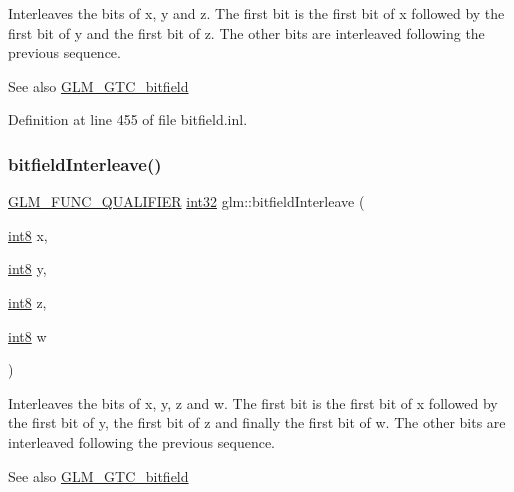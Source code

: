 Interleaves the bits of x, y and z. The first bit is the first bit of x followed by the first bit of y and the first bit of z. The other bits are interleaved following the previous sequence.

\begin{DoxySeeAlso}{See also}
\mbox{\hyperlink{group__gtc__bitfield}{G\+L\+M\+\_\+\+G\+T\+C\+\_\+bitfield}} 
\end{DoxySeeAlso}


Definition at line 455 of file bitfield.\+inl.

\mbox{\label{group__gtc__bitfield_ga7da84ecc2b3a46c9c08a9f40012359cf}} 
\subsubsection{\texorpdfstring{bitfieldInterleave()}{bitfieldInterleave()}\hspace{0.1cm}{\footnotesize\ttfamily [13/16]}}
{\footnotesize\ttfamily \mbox{\hyperlink{setup_8hpp_a33fdea6f91c5f834105f7415e2a64407}{G\+L\+M\+\_\+\+F\+U\+N\+C\+\_\+\+Q\+U\+A\+L\+I\+F\+I\+ER}} \mbox{\hyperlink{group__gtc__type__precision_ga632d8b25f6b61659f39ea4321fab92a4}{int32}} glm\+::bitfield\+Interleave (\begin{DoxyParamCaption}\item[{\mbox{\hyperlink{group__gtc__type__precision_ga96254f9c1c4506fc8eb5cf3301ce8565}{int8}}}]{x,  }\item[{\mbox{\hyperlink{group__gtc__type__precision_ga96254f9c1c4506fc8eb5cf3301ce8565}{int8}}}]{y,  }\item[{\mbox{\hyperlink{group__gtc__type__precision_ga96254f9c1c4506fc8eb5cf3301ce8565}{int8}}}]{z,  }\item[{\mbox{\hyperlink{group__gtc__type__precision_ga96254f9c1c4506fc8eb5cf3301ce8565}{int8}}}]{w }\end{DoxyParamCaption})}

Interleaves the bits of x, y, z and w. The first bit is the first bit of x followed by the first bit of y, the first bit of z and finally the first bit of w. The other bits are interleaved following the previous sequence.

\begin{DoxySeeAlso}{See also}
\mbox{\hyperlink{group__gtc__bitfield}{G\+L\+M\+\_\+\+G\+T\+C\+\_\+bitfield}} 
\end{DoxySeeAlso}


